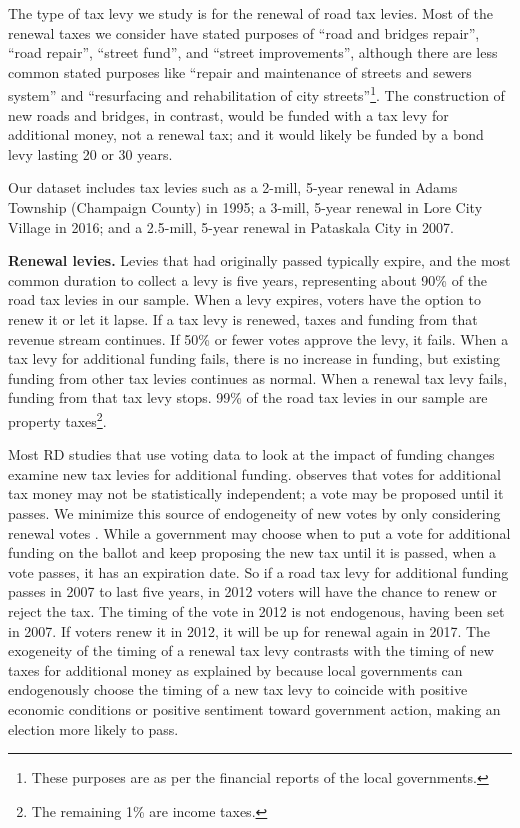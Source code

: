 The type of tax levy we study is for the renewal of road tax levies. Most of the renewal taxes we consider have stated purposes of ``road and bridges repair'', ``road repair'', ``street fund'', and ``street improvements'', although there are less common stated purposes like ``repair and maintenance of streets and sewers system'' and ``resurfacing and rehabilitation of city streets''\footnote{These purposes are as per the financial reports of the local governments.}.  The construction of new roads and bridges, in contrast, would be funded with a tax levy for additional money, not a renewal tax; and it would likely be funded by a bond levy lasting 20 or 30 years.

Our dataset includes tax levies such as a 2-mill, 5-year renewal in Adams Township (Champaign County) in 1995; a 3-mill, 5-year renewal in Lore City Village in 2016; and a 2.5-mill, 5-year renewal in Pataskala City in 2007.

{\bf Renewal levies.} Levies that had originally passed typically expire, and the most common duration to collect a levy is five years, representing about 90\% of the road tax levies in our sample. When a levy expires, voters have the option to renew it or let it lapse. If a tax levy is renewed, taxes and funding from that revenue stream continues. If 50\% or fewer votes approve the levy, it fails.  When a tax levy for additional funding fails, there is no increase in funding, but existing funding from other tax levies continues as normal.  When a renewal tax levy fails, funding from that tax levy stops. 99\% of the road tax levies in our sample are property taxes\footnote{The remaining 1\% are income taxes.}.

Most RD studies that use voting data to look at the impact of funding changes examine new tax levies for additional funding.  \cite{cellini2010value} observes that votes for additional tax money may not be statistically independent; a vote may be proposed until it passes.  We minimize this source of endogeneity of new votes by only considering renewal votes \citep{brasington2017school}.  While a government may choose when to put a vote for additional funding on the ballot and keep proposing the new tax until it is passed, when a vote passes, it has an expiration date.  So if a road tax levy for additional funding passes in 2007 to last five years, in 2012 voters will have the chance to renew or reject the tax.  The timing of the vote in 2012 is not endogenous, having been set in 2007.  If voters renew it in 2012, it will be up for renewal again in 2017. The exogeneity of the timing of a renewal tax levy contrasts with the timing of new taxes for additional money as explained by \cite{cellini2010value} because local governments can endogenously choose the timing of a new tax levy to coincide with positive economic conditions or positive sentiment toward government action, making an election more likely to pass.

